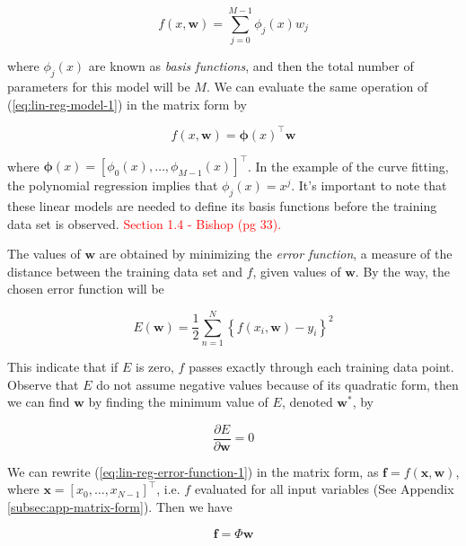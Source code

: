 \documentclass[11pt]{article} %
\begin{document}
\begin{equation}
   f(x,\mathbf{w}) = \sum_{j=0}^{M-1} \phi_j (x) w_j 
   \label{eq:lin-reg-model-1}
\end{equation}

where $\phi_j (x)$ are known as \textit{basis functions}, and then the total number of parameters for this model will be $M$. We can evaluate the same operation of (\ref{eq:lin-reg-model-1}) in the matrix form by

\begin{equation}
   f(x,\mathbf{w}) = \boldsymbol{\phi}(x)^\top  \mathbf{w}
   \label{eq:lin-reg-model-1-matrix-form}
\end{equation}

where $\boldsymbol{\phi}(x) = \left[ \phi_0(x), \dots, \phi_{M-1}(x) \right]^\top$. In the example of the curve fitting, the polynomial regression implies that $\phi_j(x)=x^j$. It's important to note that these linear models are needed to define its basis functions before the training data set is observed. \textcolor{red}{Section 1.4 - Bishop (pg 33).}

The values of $\mathbf{w}$ are obtained by minimizing the \textit{error function}, a measure of the distance between the training data set and $f$, given values of $\mathbf{w}$. By the way, the chosen error function will be 

\begin{equation}
   E(\mathbf{w}) = \frac{1}{2} \sum_{n=1}^N \left\{ f(x_i,\mathbf{w})-y_i \right\}^2
   \label{eq:lin-reg-error-function-1}
\end{equation}

This indicate that if $E$ is zero, $f$ passes exactly through each training data point. Observe that $E$ do not assume negative values because of its quadratic form, then we can find $\mathbf{w}$ by finding the minimum value of $E$, denoted $\mathbf{w^*}$, by

\begin{equation}
   \frac{\partial E}{\partial \mathbf{w}} = 0
\end{equation}

We can rewrite (\ref{eq:lin-reg-error-function-1}) in the matrix form, as $\mathbf{f} = f(\mathbf{x},\mathbf{w})$, where $\mathbf{x}=\left[ x_0,\dots, x_{N-1} \right]^\top$, i.e. $f$ evaluated for all input variables (See Appendix \ref{subsec:app-matrix-form}). Then we have

\begin{equation}
   \label{eq:lin-reg-error-function-matrix-form}
   \mathbf{f} = \Phi \mathbf{w}
\end{equation}
\end{document}

